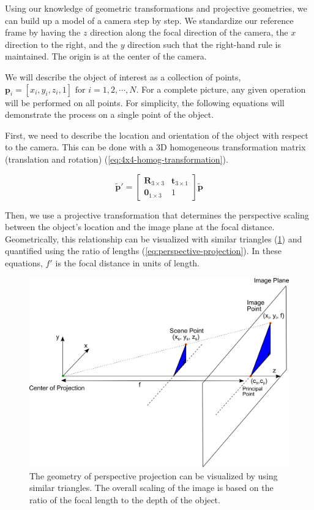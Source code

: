 Using our knowledge of geometric transformations and projective geometries, we can build up a model of a camera step by step.
We standardize our reference frame by having the $z$ direction along the focal direction of the camera, the $x$ direction to the right, and the $y$ direction such that the right-hand rule is maintained.
The origin is at the center of the camera.

We will describe the object of interest as a collection of points, $\mathbf{p}_i =  [x_i, y_i, z_i, 1] \text{ for } i = 1,2,\cdots,N$.
For a complete picture, any given operation will be performed on all points.
For simplicity, the following equations will demonstrate the process on a single point of the object.

First, we need to describe the location and orientation of the object with respect to the camera.
This can be done with a 3D homogeneous transformation matrix (translation and rotation) (\cref{eq:4x4-homog-transformation}).

\begin{equation}
    \tilde{\mathbf{p}}' = \begin{bmatrix}
        \mathbf{R}_{3 \times 3} & \mathbf{t}_{3 \times 1} \\ \mathbf{0}_{1 \times 3} & 1
    \end{bmatrix} \tilde{\mathbf{p}}
    \label{eq:4x4-homog-transformation}
\end{equation}

Then, we use a projective transformation that determines the perspective scaling between the object's location and the image plane at the focal distance.
Geometrically, this relationship can be visualized with similar triangles (\cref{fig:perspective-projection}) and quantified using the ratio of lengths (\cref{eq:perspective-projection}).
In these equations, $f'$ is the focal distance in units of length.

\begin{figure}[h!]
    \begin{center}
        \includegraphics[width=0.85\linewidth]{figs/background/png/perspective-projection.png}
    \end{center}
    \caption{The geometry of perspective projection can be visualized by using similar triangles. The overall scaling of the image is based on the ratio of the focal length to the depth of the object.}
    \label{fig:perspective-projection}
\end{figure}


